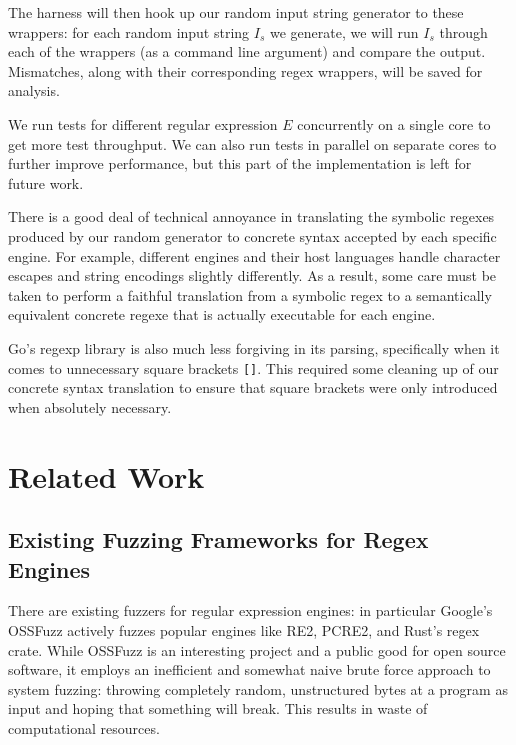 \documentclass[acmsmall,nonacm,screen]{acmart}
\begin{document}
The harness will then hook up our random input string generator to these wrappers: for each random input string $I_s$ we generate, we will run $I_s$ through each of the wrappers (as a command line argument) and compare the output. Mismatches, along with their corresponding regex wrappers, will be saved for analysis.

We run tests for different regular expression $E$ concurrently on a single core to get more test throughput. We can also run tests in parallel on separate cores to further improve performance, but this part of the implementation is left for future work.

There is a good deal of technical annoyance in translating the symbolic regexes produced by our random generator to concrete syntax accepted by each specific engine. For example, different engines and their host languages handle character escapes and string encodings slightly differently. As a result, some care must be taken to perform a faithful translation from a symbolic regex to a semantically equivalent concrete regexe that is actually executable for each engine.

Go's regexp library is also much less forgiving in its parsing, specifically when it comes to unnecessary square brackets \texttt{[]}. This required some cleaning up of our concrete syntax translation to ensure that square brackets were only introduced when absolutely necessary.

\section{Related Work}
\subsection{Existing Fuzzing Frameworks for Regex Engines}
There are existing fuzzers for regular expression engines: in particular Google's OSSFuzz actively fuzzes popular engines like RE2, PCRE2, and Rust's regex crate. While OSSFuzz is an interesting project and a public good for open source software, it employs an inefficient and somewhat naive brute force approach to system fuzzing: throwing completely random, unstructured bytes at a program as input and hoping that something will break. This results in waste of computational resources.
\end{document}
